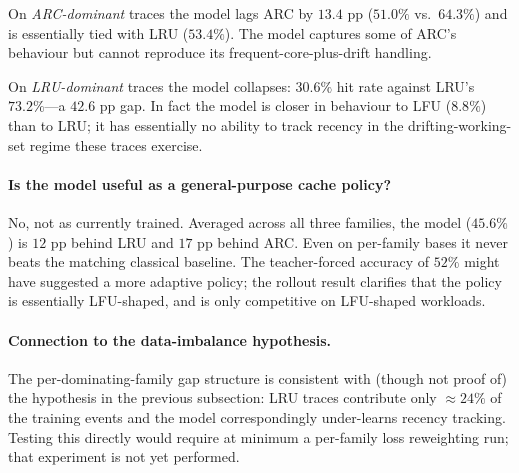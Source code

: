 \documentclass{article}
\begin{document}
On \emph{ARC-dominant} traces the model lags ARC by $13.4$ pp ($51.0\%$ vs.\
$64.3\%$) and is essentially tied with LRU ($53.4\%$). The model captures
some of ARC's behaviour but cannot reproduce its frequent-core-plus-drift
handling.

On \emph{LRU-dominant} traces the model collapses: $30.6\%$ hit rate against
LRU's $73.2\%$---a $42.6$ pp gap. In fact the model is closer in behaviour
to LFU ($8.8\%$) than to LRU; it has essentially no ability to track recency
in the drifting-working-set regime these traces exercise.

\paragraph{Is the model useful as a general-purpose cache policy?} No, not
as currently trained. Averaged across all three families, the model
($45.6\%$) is $12$ pp behind LRU and $17$ pp behind ARC. Even on per-family
bases it never beats the matching classical baseline. The teacher-forced
accuracy of $52\%$ might have suggested a more adaptive policy; the rollout
result clarifies that the policy is essentially LFU-shaped, and is only
competitive on LFU-shaped workloads.

\paragraph{Connection to the data-imbalance hypothesis.} The
per-dominating-family gap structure is consistent with (though not proof of)
the hypothesis in the previous subsection: LRU traces contribute only
$\approx\!24\%$ of the training events and the model correspondingly
under-learns recency tracking. Testing this directly would require at
minimum a per-family loss reweighting run; that experiment is not yet
performed.
\end{document}
